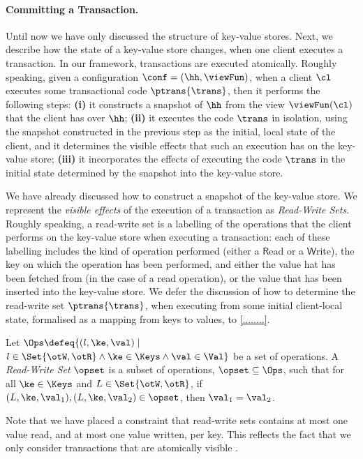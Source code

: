 \paragraph{Committing a Transaction.}
Until now we have only discussed the structure of key-value stores. 
Next, we describe how the state of a key-value store changes, when 
one client executes a transaction. 
In our framework, transactions are executed atomically. 
Roughly speaking, given a configuration $\conf = (\hh, \viewFun)$, 
when a client $\cl$ executes some transactional code $\ptrans{\trans}$, 
then it performs the following steps: 
\textbf{(i)} it constructs a snapshot of $\hh$ from the view $\viewFun(\cl)$ that 
the client has over $\hh$; \textbf{(ii)} it executes the code $\trans$ in isolation, using the 
snapshot constructed in the previous step as the initial, local state of the client, and it determines the visible 
effects that such an execution has on the key-value store; \textbf{(iii)} it incorporates 
the effects of executing the code $\trans$ in the initial state determined by the snapshot into 
the key-value store.

We have already discussed how to construct a snapshot of the key-value store. 
We represent the \emph{visible effects} of the execution of a transaction as \emph{Read-Write Sets}. 
Roughly speaking, a read-write set is a labelling of the operations that the client performs on  
the key-value store when executing a transaction: each of these labelling includes the kind of 
operation performed (either a $\mathsf{R}$ead or a $\mathsf{W}$rite), 
the key on which the operation has been performed, and either the value hat has been fetched from 
(in the case of a read operation), or the value that has been inserted into the key-value store.
We defer the discussion of how to determine the read-write set $\ptrans{\trans}$, 
when executing from some initial client-local state, formalised as a mapping from keys to values, to 
\cref{........}. 

\begin{definition}
Let 
$\Ops \defeq \{(l, \ke, \val) \mid$ $ l \in \Set{\otW, \otR} \land \ke \in \Keys \wedge \val \in \Val \}$ 
be a set of operations. 
A \emph{Read-Write Set} $\opset$ is a subset of operations, $\opset \subseteq \Ops$,
such that for all $\ke \in \Keys$ and \( L \in \Set{\otW, \otR} \),
if $(L, \ke, \val_1), (L, \ke, \val_2) \in \opset$, then $\val_1 = \val_2$.
\end{definition}
Note that we have placed a constraint that read-write sets contains at most one value read, 
and at most one value written, per key. This reflects the fact that we only consider transactions 
that are atomically visible \cite{laws}.

